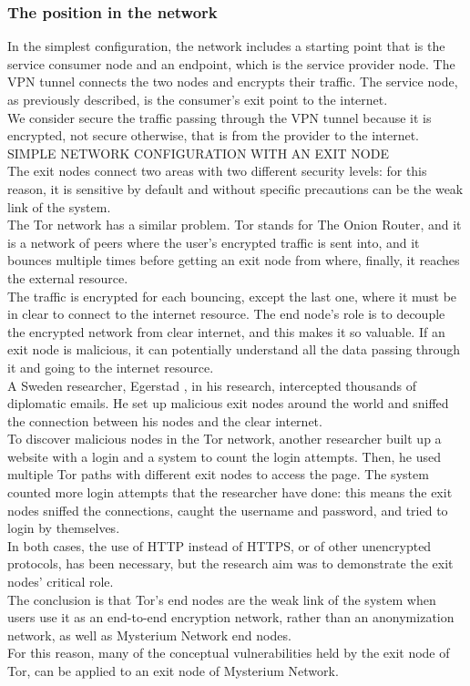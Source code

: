 \documentclass[]{article}
\begin{document}
	\subsubsection{The position in the network}

	In the simplest configuration, the network includes a starting point that is the service consumer node and an endpoint, which is the service provider node. The VPN tunnel connects the two nodes and encrypts their traffic. The service node, as previously described, is the consumer's exit point to the internet.\\
	We consider secure the traffic passing through the VPN tunnel because it is encrypted, not secure otherwise, that is from the provider to the internet.\\

	SIMPLE NETWORK CONFIGURATION WITH AN EXIT NODE\\

	The exit nodes connect two areas with two different security levels: for this reason, it is sensitive by default and without specific precautions can be the weak link of the system.\\
	The Tor network has a similar problem. Tor stands for The Onion Router, and it is a network of peers where the user's encrypted traffic is sent into, and it bounces multiple times before getting an exit node from where, finally, it reaches the external resource.\\
	The traffic is encrypted for each bouncing, except the last one, where it must be in clear to connect to the internet resource. The end node's role is to decouple the encrypted network from clear internet, and this makes it so valuable. If an exit node is malicious, it can potentially understand all the data passing through it and going to the internet resource.\\
	A Sweden researcher, Egerstad \cite{exitnodeTOR}, in his research, intercepted thousands of diplomatic emails. He set up malicious exit nodes around the world and sniffed the connection between his nodes and the clear internet.\\
	To discover malicious nodes in the Tor network, another researcher built up a website with a login and a system to count the login attempts. Then, he used multiple Tor paths with different exit nodes to access the page. The system counted more login attempts that the researcher have done: this means the exit nodes sniffed the connections, caught the username and password, and tried to login by themselves.\\
	In both cases, the use of HTTP instead of HTTPS, or of other unencrypted protocols, has been necessary, but the research aim was to demonstrate the exit nodes' critical role.\\
	The conclusion is that Tor's end nodes are the weak link of the system when users use it as an end-to-end encryption network, rather than an anonymization network, as well as Mysterium Network end nodes.\\
	For this reason, many of the conceptual vulnerabilities held by the exit node of Tor, can be applied to an exit node of Mysterium Network.\\
\end{document}
